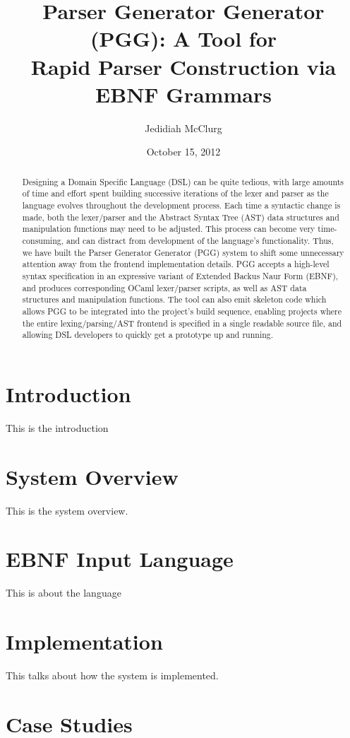 \documentclass[10pt]{article}
\title{Parser Generator Generator (PGG): A Tool for \\ Rapid Parser Construction via EBNF Grammars}
\author{Jedidiah McClurg}
\date{October 15, 2012}
\begin{document}
\maketitle

\begin{abstract}
Designing a Domain Specific Language (DSL) can be quite tedious,
with large amounts of time and effort spent building successive
iterations of the lexer and parser as the language evolves
throughout the development process.
Each time a syntactic change is made, both the lexer/parser and
the Abstract Syntax Tree (AST) data structures and manipulation
functions may need to be adjusted.  This process can become very
time-consuming, and can distract from development of the
language's functionality.  Thus, we have built the Parser
Generator Generator (PGG) system to shift some unnecessary
attention away from the frontend implementation details.  PGG accepts a high-level
syntax specification in an expressive variant of Extended Backus Naur Form (EBNF),
and produces corresponding OCaml lexer/parser scripts, as
well as AST data structures and manipulation functions.  The
tool can also emit skeleton code which allows
PGG to be integrated into the project's build sequence,  
enabling projects where the entire lexing/parsing/AST
frontend is specified in a single readable source file,
and allowing DSL developers to quickly get a prototype up and running.
\end{abstract}

\section{Introduction}
This is the introduction

\section{System Overview}
This is the system overview.

\section{EBNF Input Language}
This is about the language

\section{Implementation}
This talks about how the system is implemented.

\section{Case Studies}
\end{document}
